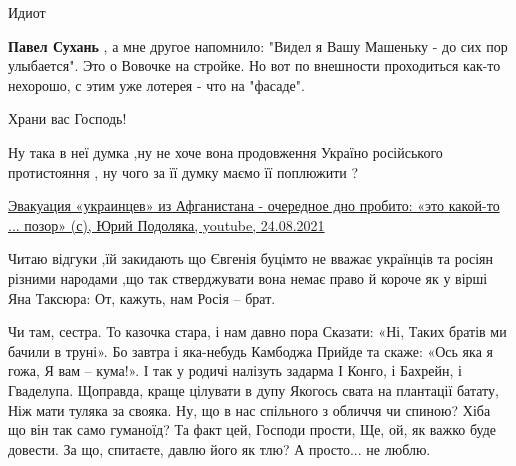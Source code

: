 \begin{itemize}
\begin{itemize}
Идиот

 
\textbf{Павел Сухань} , а мне другое напомнило: "Видел я Вашу Машеньку - до сих
пор улыбается". Это о Вовочке на стройке. Но вот по внешности проходиться
как-то нехорошо, с этим уже лотерея - что на "фасаде".
\end{itemize}

 
Храни вас Господь!

 
Ну така в неї думка ,ну не хоче вона продовження Україно російського протистояння , ну чого за її думку маємо її поплюжити ?

 
\href{https://youtu.be/XcXxLJcQfJc}{%
Эвакуация «украинцев» из Афганистана - очередное дно пробито: «это какой-то ... позор» (с), %
Юрий Подоляка, youtube, 24.08.2021%
}

 

Читаю відгуки ,їй закидають що Євгенія буцімто не вважає українців та росіян
різними народами ,що так стверджувати вона немає право й короче як у вірші Яна
Таксюра: От, кажуть, нам Росія – брат.

\obeycr
Чи там, сестра.
То казочка стара, і нам давно пора
Сказати: «Ні,
Таких братів ми бачили в труні».
\smallskip
Бо завтра і яка-небудь Камбоджа
Прийде та скаже: «Ось яка я гожа,
Я вам – кума!».
І так у родичі налізуть задарма
І Конго, і Бахрейн, і Гваделупа.
\smallskip
Щоправда, краще цілувати в дупу
Якогось свата на плантації батату,
Ніж мати туляка за свояка.
\smallskip
Ну, що в нас спільного з обличчя чи
спиною?
Хіба що він так само гуманоїд?
Та факт цей, Господи прости,
Ще, ой, як важко буде довести.
\smallskip
За що, спитаєте, давлю його як
тлю?
А просто... не люблю.
\restorecr


\end{itemize}
